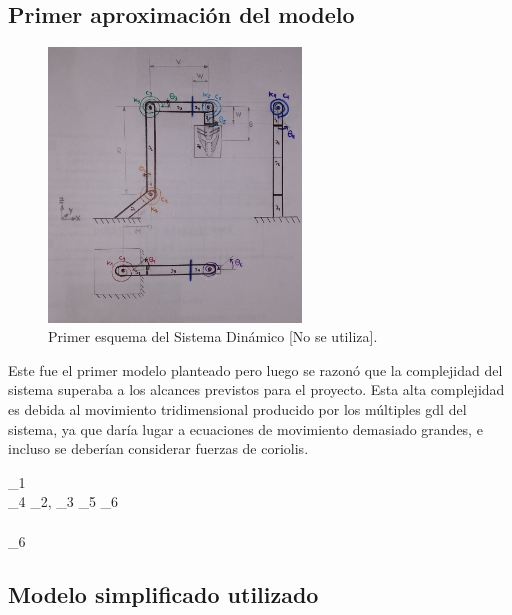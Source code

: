 \documentclass{aleph-revista}
\begin{document}
\subsection{Primer aproximación del modelo}

\begin{figure}[H]
    \centering
    \includegraphics[width=0.60\textwidth]{Imagenes/modelo_4.jpg}
    \caption{Primer esquema del Sistema Dinámico [No se utiliza].}
    \label{fig:etiqueta de la figura}
\end{figure}

Este fue el primer modelo planteado pero luego se razonó que la complejidad del sistema superaba a los alcances previstos para el proyecto. Esta alta complejidad es debida al movimiento tridimensional producido por los múltiples gdl del sistema, ya que daría lugar a ecuaciones de movimiento demasiado grandes, e incluso se deberían considerar fuerzas de coriolis.

\theta_1 \\  \theta_4  \theta_2, \theta_3  \theta_5  \theta_6  \\
\\  \theta_6  \\


\subsection{Modelo simplificado utilizado}
\end{document}

